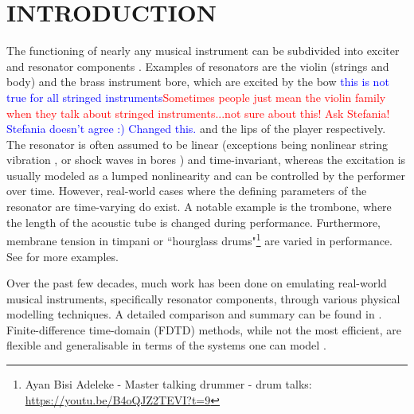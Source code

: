 \documentclass[fleqn]{jaes}
\def\SBcomment[#1]{\textcolor{red}{#1}}
\def\SWcomment[#1]{\textcolor{blue}{#1}}
\begin{document}
\section{INTRODUCTION}\label{sec:introduction}

The functioning of nearly any musical instrument can be subdivided into exciter and resonator components \cite{mcintyre1983oscillations, Borin1989}. Examples of resonators are the violin (strings and body) and the brass instrument bore, which are excited by the bow \SWcomment[this is not true for all stringed instruments]\SBcomment[Sometimes people just mean the violin family when they talk about stringed instruments...not sure about this! Ask Stefania!] \SWcomment[Stefania doesn't agree :) Changed this.] and the lips of the player respectively. The resonator is often assumed to be linear (exceptions being nonlinear string vibration \cite{Carrier1945}, or shock waves in bores \cite{Hirschberg1996, Msallam2000, Vergez2000}) and time-invariant, whereas the excitation is usually modeled as a lumped nonlinearity and can be controlled by the performer over time. However, real-world cases where the defining parameters of the resonator are time-varying do exist.
A notable example is the trombone, where the length of the acoustic tube is changed during performance. Furthermore, membrane tension in timpani or ``hourglass drums"\footnote{Ayan Bisi Adeleke - Master talking drummer - drum talks: \url{https://youtu.be/B4oQJZ2TEVI?t=9}} are varied in performance. %
See \cite[Sec. 12.4]{Willemsen2021Thesis} for more examples. 

Over the past few decades, much work has been done on emulating real-world musical instruments, specifically resonator components, through various physical modelling techniques. A detailed comparison and summary can be found in \cite{valimaki2005discrete}. Finite-difference time-domain (FDTD) methods, while not the most efficient, are flexible and generalisable in terms of the systems one can model \cite{Bilbao2009}.
\end{document}
